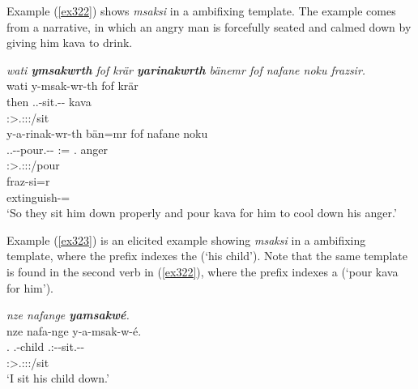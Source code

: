 Example (\ref{ex322}) shows \emph{msaksi} in a  ambifixing template. The example comes from a narrative, in which an angry man is forcefully seated and calmed down by giving him kava to drink.

\begin{exe}
	\ex \emph{wati \textbf{ymsakwrth} fof krär \textbf{yarinakwrth} bänemr fof nafane noku frazsir.}\\
	\glll wati y-msak-wr-th fof krär\\
	then \Tsg.\Masc.\Alph-sit.\Ext-\Ndu-\Stnsg{} \Emph{} kava\\
	{} \footnotesize{\Stpl:\Sbj>\Tsg.\Masc:\Obj:\Nonpast:\Ipfv/sit} {} {}\\
	\sn
	\glll y-a-rinak-wr-th bän=mr fof nafane noku\\
	\Tsg.\Masc.\Alph-\Vc-pour.\Ext-\Ndu-\Stnsg{} \Dem:\Med=\Purp{} \Emph{} \Tsg.\Poss{} anger\\
	\footnotesize{\Stpl:\Sbj>\Tsg.\Masc:\Io:\Nonpast:\Ipfv/pour} {} {} {}\\
	\sn
	\gll fraz-si=r\\
	extinguish-\Nmlz=\Purp{}\\
	\trans `So they sit him down properly and pour kava for him to cool down his anger.'
	\label{ex322}
\end{exe}

Example (\ref{ex323}) is an elicited example showing \emph{msaksi} in a  ambifixing template, where the  prefix indexes the  (`his child'). Note that the same template is found in the second verb in (\ref{ex322}), where the  prefix indexes a  (`pour kava for him').

\begin{exe}
	\ex \textit{nze nafange \textbf{yamsakwé}.}\\
	\glll nze nafa-nge y-a-msak-w-é.\\
	 \Fsg{}.\Erg{} \Third.\Poss-child \Tsg{}.\Masc{}:\Alph{}-\Vc{}-sit.\Ext{}-\Ndu{}-\Fsg{}\\
	  {} {} \footnotesize{\Fsg:\Sbj>\Tsg.\Masc:\Io:\Nonpast:\Ipfv/sit}\\
	\trans `I sit his child down.'
	\label{ex323}
\end{exe}

